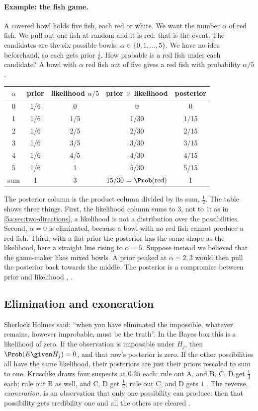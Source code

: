 \paragraph{Example: the fish game.}
A covered bowl holds five fish, each red or white. We want the number $\alpha$ of red
fish. We pull out one fish at random and it is red: that is the event. The
candidates are the six possible bowls, $\alpha\in\{0,1,\dots,5\}$. We have no idea
beforehand, so each gets prior $\frac16$. How probable is a red fish under each
candidate? A bowl with $\alpha$ red fish out of five gives a red fish with
probability $\alpha/5$.
\begin{center}
\small
\begin{tabular}{@{}ccccc@{}}
\toprule
$\alpha$ & prior & likelihood $\alpha/5$ & prior $\times$ likelihood & posterior\\
\midrule
0 & 1/6 & 0   & 0    & 0\\
1 & 1/6 & 1/5 & 1/30 & 1/15\\
2 & 1/6 & 2/5 & 2/30 & 2/15\\
3 & 1/6 & 3/5 & 3/30 & 3/15\\
4 & 1/6 & 4/5 & 4/30 & 4/15\\
5 & 1/6 & 1   & 5/30 & 5/15\\
\midrule
sum & 1 & 3 & 15/30 $=\Prob(\text{red})$ & 1\\
\bottomrule
\end{tabular}
\end{center}
The posterior column is the product column divided by its sum, $\frac12$. The
table shows three things. First, the likelihood column sums to $3$, not to $1$:
as in \cref{5a:sec:two-directions}, a likelihood is not a distribution over the
possibilities. Second, $\alpha=0$ is eliminated, because a bowl with no red fish
cannot produce a red fish. Third, with a flat prior the posterior has the same
shape as the likelihood, here a straight line rising to $\alpha=5$. Suppose
instead we believed that the game-maker likes mixed bowls. A prior peaked at
$\alpha=2,3$ would then pull the posterior back towards the middle. The posterior
is a compromise between prior and likelihood ,
.

\subsection{Elimination and exoneration}

Sherlock Holmes said: ``when you have eliminated the impossible, whatever remains,
however improbable, must be the truth''. In the Bayes box this is a likelihood of
zero. If the observation is impossible under $H_j$, then $\Prob(E\given H_j)=0$, and
that row's posterior is zero. If the other possibilities all have the same
likelihood, their posteriors are just their priors rescaled to sum to one. Kruschke
draws four suspects at $0.25$ each: rule out A, and B, C, D get $\frac13$ each;
rule out B as well, and C, D get $\frac12$; rule out C, and D gets $1$
. The reverse, \emph{exoneration}, is an
observation that only one possibility can produce: then that possibility gets
credibility one and all the others are cleared .

